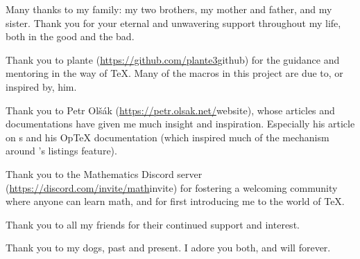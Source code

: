 Many thanks to my family: my two brothers, my mother and father, and my sister.
Thank you for your eternal and unwavering support throughout my life, both in the good and the bad.

Thank you to plante (\url{https://github.com/plante3}{github}) for the guidance and mentoring in the way of \TeX.
Many of the macros in this project are due to, or inspired by, him.

Thank you to Petr Ol\v s\'ak (\url{https://petr.olsak.net/}{website}), whose articles and documentations have given me much insight and inspiration.
Especially his article on \macro\pdfliteral s and his Op\TeX{} documentation (which inspired much of the mechanism around \pdftoolbox's listings feature).

Thank you to the Mathematics Discord server (\url{https://discord.com/invite/math}{invite}) for fostering a welcoming community where anyone can learn math, and for first introducing me to the world of \TeX.

Thank you to all my friends for their continued support and interest.

Thank you to my dogs, past and present.
I adore you both, and will forever.

